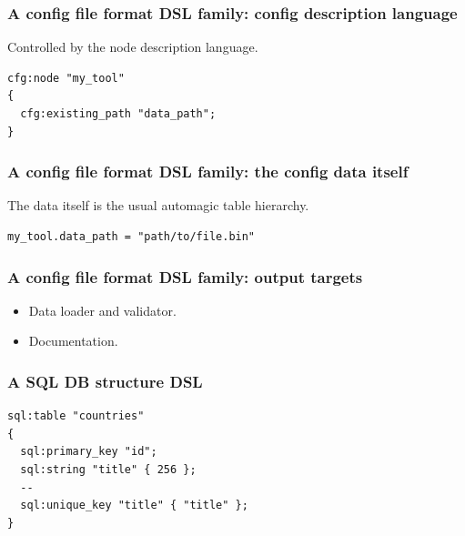 \documentclass[handout]{beamer}
\begin{document}

\begin{frame}[fragile]

\frametitle{A config file format DSL family: config description language}

Controlled by the node description language.

\begin{verbatim}
cfg:node "my_tool"
{
  cfg:existing_path "data_path";
}
\end{verbatim}

\end{frame}


\begin{frame}[fragile]

\frametitle{A config file format DSL family: the config data itself}

The data itself is the usual automagic table hierarchy.

\begin{verbatim}
my_tool.data_path = "path/to/file.bin"
\end{verbatim}

\end{frame}


\begin{frame}

\frametitle{A config file format DSL family: output targets}

\begin{itemize}
\item Data loader and validator.
\item Documentation.
\end{itemize}

\end{frame}


\begin{frame}[fragile]

\frametitle{A SQL DB structure DSL}

\begin{verbatim}
sql:table "countries"
{
  sql:primary_key "id";
  sql:string "title" { 256 };
  --
  sql:unique_key "title" { "title" };
}
\end{verbatim}

\end{frame}
\end{document}
